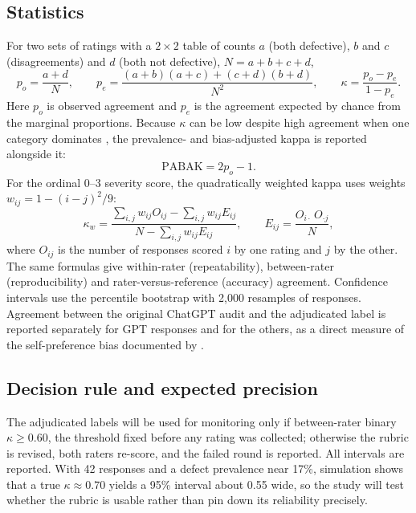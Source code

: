 \documentclass[11pt]{article}
\begin{document}
\subsection{Statistics}
For two sets of ratings with a $2\times2$ table of counts $a$ (both defective), $b$ and $c$ (disagreements) and $d$ (both not defective), $N=a+b+c+d$,
\begin{equation}
p_o=\frac{a+d}{N},\qquad p_e=\frac{(a+b)(a+c)+(c+d)(b+d)}{N^2},\qquad \kappa=\frac{p_o-p_e}{1-p_e}.
\label{eq:kappa}
\end{equation}
Here $p_o$ is observed agreement and $p_e$ is the agreement expected by chance from the marginal proportions. Because $\kappa$ can be low despite high agreement when one category dominates \citep{feinstein1990}, the prevalence- and bias-adjusted kappa \citep{byrt1993} is reported alongside it:
\begin{equation}
\mathrm{PABAK}=2p_o-1.
\label{eq:pabak}
\end{equation}
For the ordinal 0--3 severity score, the quadratically weighted kappa \citep{cohen1968} uses weights $w_{ij}=1-(i-j)^2/9$:
\begin{equation}
\kappa_w=\frac{\sum_{i,j}w_{ij}O_{ij}-\sum_{i,j}w_{ij}E_{ij}}{N-\sum_{i,j}w_{ij}E_{ij}},\qquad E_{ij}=\frac{O_{i\cdot}\,O_{\cdot j}}{N},
\label{eq:wkappa}
\end{equation}
where $O_{ij}$ is the number of responses scored $i$ by one rating and $j$ by the other. The same formulas give within-rater (repeatability), between-rater (reproducibility) and rater-versus-reference (accuracy) agreement. Confidence intervals use the percentile bootstrap with 2{,}000 resamples of responses. Agreement between the original ChatGPT audit and the adjudicated label is reported separately for GPT responses and for the others, as a direct measure of the self-preference bias documented by \citet{panickssery2024self}.

\subsection{Decision rule and expected precision}
The adjudicated labels will be used for monitoring only if between-rater binary $\kappa\ge0.60$, the threshold fixed before any rating was collected; otherwise the rubric is revised, both raters re-score, and the failed round is reported. All intervals are reported. With 42 responses and a defect prevalence near 17\%, simulation shows that a true $\kappa\approx0.70$ yields a 95\% interval about 0.55 wide, so the study will test whether the rubric is usable rather than pin down its reliability precisely.
\end{document}
